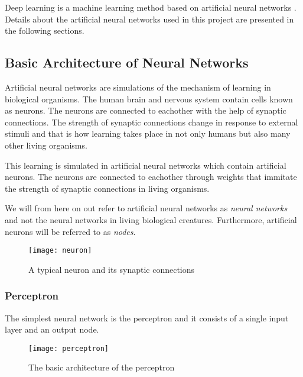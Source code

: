 \documentclass[titlepage]{article}
\begin{document}
\vskip 0.2cm

Deep learning is a machine learning method based on artificial neural networks \cite{deeplearning}. Details about the artificial neural networks used in this project are presented in the following sections. 

\subsection{Basic Architecture of Neural Networks}

\vskip 0.2cm

Artificial neural networks \cite{charu} are simulations of the mechanism of learning in biological organisms. The human brain and nervous system contain cells known as neurons. The neurons are connected to eachother with the help of synaptic connections. The strength of synaptic connections change in response to external stimuli and that is how learning takes place in not only humans but also many other living organisms. 

\vskip 0.3cm

\noindent
This learning is simulated in artificial neural networks \cite{charu} which contain artificial neurons. The neurons are connected to eachother through weights that immitate the strength of synaptic connections in living organisms.

\vskip 0.3cm

\noindent
We will from here on out refer to artificial neural networks as \emph{neural networks} and not the neural networks in living biological creatures. Furthermore, artificial neurons will be referred to as \emph{nodes}.

\vskip 0.5cm

\begin{figure}[h]
    \centering
    \texttt{[image: neuron]}
    \caption{A typical neuron and its synaptic connections}
\end{figure}

\subsubsection{Perceptron}

\vskip 0.2cm

The simplest neural network is the perceptron \cite{charu} and it consists of a single input layer and an output node. 

\begin{figure}[h]
    \centering
    \texttt{[image: perceptron]}
    \caption{The basic architecture of the perceptron}
\end{figure}
\end{document}
